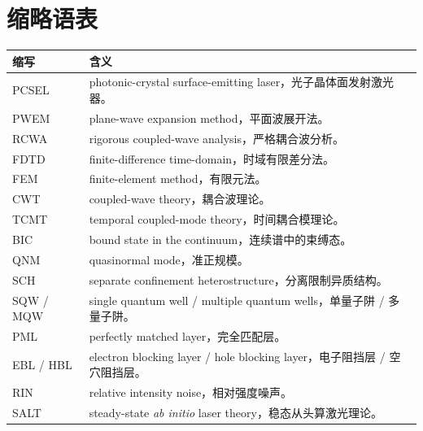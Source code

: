 \chapter*{缩略语表}

\begin{longtable}{p{}p{}}
\toprule
缩写 & 含义 \\
\midrule
\endhead
PCSEL & photonic-crystal surface-emitting laser，光子晶体面发射激光器。 \\
PWEM & plane-wave expansion method，平面波展开法。 \\
RCWA & rigorous coupled-wave analysis，严格耦合波分析。 \\
FDTD & finite-difference time-domain，时域有限差分法。 \\
FEM & finite-element method，有限元法。 \\
CWT & coupled-wave theory，耦合波理论。 \\
TCMT & temporal coupled-mode theory，时间耦合模理论。 \\
BIC & bound state in the continuum，连续谱中的束缚态。 \\
QNM & quasinormal mode，准正规模。 \\
SCH & separate confinement heterostructure，分离限制异质结构。 \\
SQW / MQW & single quantum well / multiple quantum wells，单量子阱 / 多量子阱。 \\
PML & perfectly matched layer，完全匹配层。 \\
EBL / HBL & electron blocking layer / hole blocking layer，电子阻挡层 / 空穴阻挡层。 \\
RIN & relative intensity noise，相对强度噪声。 \\
SALT & steady-state \emph{ab initio} laser theory，稳态从头算激光理论。 \\
\bottomrule
\end{longtable}
